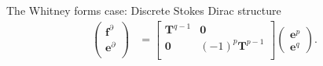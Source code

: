 \documentclass[aspectratio=169]{beamer}
\begin{document}
\begin{frame}{The Whitney forms case: Discrete Stokes Dirac structure}
\begin{equation*}
\begin{aligned}
		\begin{pmatrix}
			\mathbf{f}^\partial \\
			\mathbf{e}^\partial \\
		\end{pmatrix} &= 
		\begin{bmatrix}
			\mathbf{T}^{q-1} & \mathbf{0} \\
			\mathbf{0} & (-1)^p\mathbf{T}^{p-1} \\
		\end{bmatrix}
		\begin{pmatrix}
			\mathbf{e}^p \\
			\mathbf{e}^q
		\end{pmatrix}.
	\end{aligned}
\end{equation*}
\end{frame}
\end{document}
